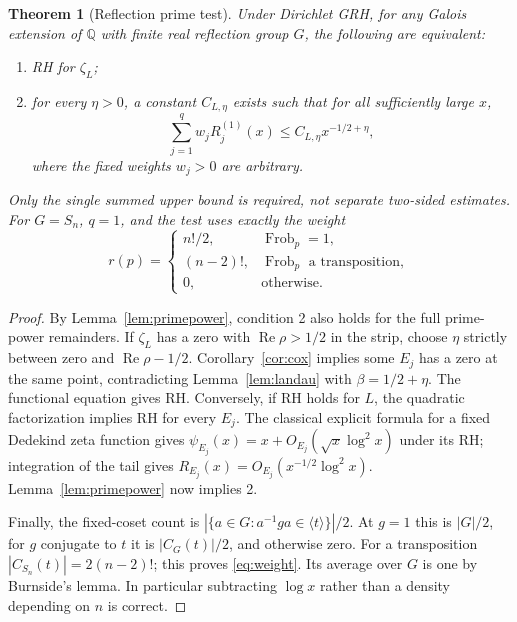\documentclass[11pt]{article}
\newtheorem{theorem}{Theorem}[section]
\theoremstyle{remark}\newtheorem{remark}[theorem]{Remark}
\newcommand{\Rea}{\operatorname{Re}}
\newcommand{\Frob}{\operatorname{Frob}}
\newcommand{\Q}{\mathbb Q}
\begin{document}
\begin{theorem}[Reflection prime test]\label{thm:test}
Under Dirichlet GRH, for any Galois extension of $\Q$ with finite real reflection group $G$, the following are equivalent:
\begin{enumerate}
\item RH for $\zeta_L$;
\item for every $\eta>0$, a constant $C_{L,\eta}$ exists such that for all sufficiently large $x$,
\begin{equation}\label{eq:target}
 \sum_{j=1}^q w_j R_j^{(1)}(x)\le C_{L,\eta}x^{-1/2+\eta},
\end{equation}
where the fixed weights $w_j>0$ are arbitrary.
\end{enumerate}
Only the single summed upper bound is required, not separate two-sided estimates. For $G=S_n$, $q=1$, and the test uses exactly the weight
\begin{equation}\label{eq:weight}
 r(p)=\begin{cases}
 n!/2,&\Frob_p=1,\\
 (n-2)!,&\Frob_p\text{ a transposition},\\
 0,&\text{otherwise}.
 \end{cases}
\end{equation}
\end{theorem}
\begin{proof}
By Lemma~\ref{lem:primepower}, condition 2 also holds for the full prime-power remainders. If $\zeta_L$ has a zero with $\Rea\rho>1/2$ in the strip, choose $\eta$ strictly between zero and $\Rea\rho-1/2$. Corollary~\ref{cor:cox} implies some $E_j$ has a zero at the same point, contradicting Lemma~\ref{lem:landau} with $\beta=1/2+\eta$. The functional equation gives RH. Conversely, if RH holds for $L$, the quadratic factorization implies RH for every $E_j$. The classical explicit formula for a fixed Dedekind zeta function gives $\psi_{E_j}(x)=x+O_{E_j}(\sqrt{x}\log^2 x)$ under its RH; integration of the tail gives $R_{E_j}(x)=O_{E_j}(x^{-1/2}\log^2 x)$. Lemma~\ref{lem:primepower} now implies 2.

Finally, the fixed-coset count is $|\{a\in G:a^{-1}ga\in\langle t\rangle\}|/2$. At $g=1$ this is $|G|/2$, for $g$ conjugate to $t$ it is $|C_G(t)|/2$, and otherwise zero. For a transposition $|C_{S_n}(t)|=2(n-2)!$; this proves \eqref{eq:weight}. Its average over $G$ is one by Burnside's lemma. In particular subtracting $\log x$ rather than a density depending on $n$ is correct.
\end{proof}
\end{document}
